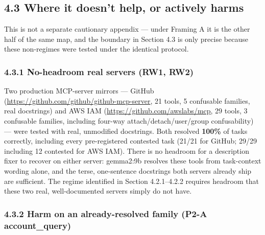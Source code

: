 \hypertarget{where-it-doesnt-help-or-actively-harms}{%
\subsection{4.3 Where it doesn't help, or actively
harms}\label{where-it-doesnt-help-or-actively-harms}}

This is not a separate cautionary appendix --- under Framing A it is the
other half of the same map, and the boundary in Section 4.3 is only
precise because these non-regimes were tested under the identical
protocol.

\hypertarget{no-headroom-real-servers-rw1-rw2}{%
\subsubsection{4.3.1 No-headroom real servers (RW1,
RW2)}\label{no-headroom-real-servers-rw1-rw2}}

Two production MCP-server mirrors --- GitHub
(\url{https://github.com/github/github-mcp-server}, 21 tools, 5 confusable families,
real docstrings) and AWS IAM (\url{https://github.com/awslabs/mcp}, 29 tools, 3
confusable families, including four-way attach/detach/user/group
confusability) --- were tested with real, unmodified docstrings. Both
resolved \textbf{100\%} of tasks correctly, including every
pre-registered contested task (21/21 for GitHub; 29/29 including 12
contested for AWS IAM). There is no headroom for a description fixer to
recover on either server: gemma2:9b resolves these tools from
task-context wording alone, and the terse, one-sentence docstrings both
servers already ship are sufficient. The regime identified in Section
4.2.1--4.2.2 requires headroom that these two real, well-documented
servers simply do not have.

\hypertarget{harm-on-an-already-resolved-family-p2-a-account_query}{%
\subsubsection{4.3.2 Harm on an already-resolved family (P2-A
account\_query)}\label{harm-on-an-already-resolved-family-p2-a-account_query}}

